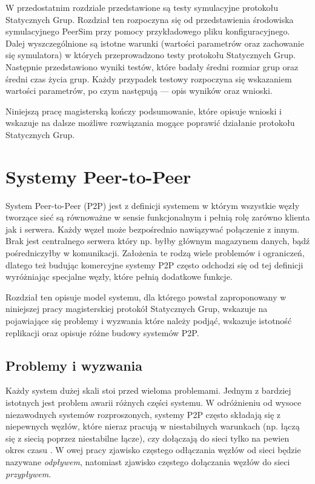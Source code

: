 \documentclass[12pt, twoside, openany]{report}
\begin{document}
W przedostatnim rozdziale przedstawione są testy symulacyjne protokołu Statycznych Grup. Rozdział ten rozpoczyna się od przedstawienia środowiska symulacyjnego PeerSim przy pomocy przykładowego pliku konfiguracyjnego. Dalej wyszczególnione są istotne warunki (wartości parametrów oraz zachowanie się symulatora) w których przeprowadzono testy protokołu Statycznych Grup. Następnie przedstawiono wyniki testów, które badały średni rozmiar grup oraz średni czas życia grup. Każdy przypadek testowy rozpoczyna się wskazaniem wartości parametrów, po czym następują --- opis wyników oraz wnioski. 

Niniejszą pracę magisterską kończy podsumowanie, które opisuje wnioski i wskazuje na dalsze możliwe rozwiązania mogące poprawić działanie protokołu Statycznych Grup.

\chapter{Systemy Peer-to-Peer}

System Peer-to-Peer (P2P) \cite{bib:martins, bib:jeyasheeli, bib:chord} jest z definicji systemem w którym wszystkie węzły tworzące sieć są równoważne w sensie funkcjonalnym i pełnią rolę zarówno klienta jak i serwera. Każdy węzeł może bezpośrednio nawiązywać połączenie z innym. Brak jest centralnego serwera który np. byłby głównym magazynem danych, bądź pośredniczyłby w komunikacji. Założenia te rodzą wiele problemów i ograniczeń, dlatego też budując komercyjne systemy P2P często odchodzi się od tej definicji wyróżniając specjalne węzły, które pełnią dodatkowe funkcje.

Rozdział ten opisuje model systemu, dla którego powstał zaproponowany w niniejszej pracy magisterskiej protokół Statycznych Grup, wskazuje na pojawiające się problemy i wyzwania które należy podjąć, wskazuje istotność replikacji oraz opisuje różne budowy systemów P2P.

\section{Problemy i wyzwania}

Każdy system dużej skali stoi przed wieloma problemami. Jednym z bardziej istotnych jest problem awarii różnych części systemu. W odróżnieniu od wysoce niezawodnych systemów rozproszonych, systemy P2P często składają się z niepewnych węzłów, które nieraz pracują w niestabilnych warunkach (np. łączą się z siecią poprzez niestabilne łącze), czy dołączają do sieci tylko na pewien okres czasu \cite{bib:paiva}. W owej pracy zjawisko częstego odłączania węzłów od sieci będzie nazywane \textit{odpływem}, natomiast zjawisko częstego dołączania węzłów do sieci \textit{przypływem}.
\end{document}
